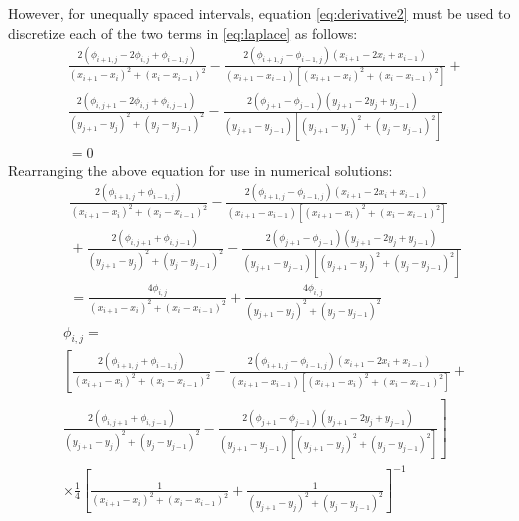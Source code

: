 \documentclass[12pt,a4paper,fleqn]{article}
\begin{document}
    However, for unequally spaced intervals, equation \eqref{eq:derivative2} must be used to discretize each of the two terms in \eqref{eq:laplace} as follows:
    \begin{align} \label{eq:numlaplace3}
    &\frac{2(\phi_{i+1,j} - 2\phi_{i,j} + \phi_{i-1,j})}{(x_{i+1} - x_i)^2 + (x_i - x_{i-1})^2} - \frac{2(\phi_{i+1,j} - \phi_{i-1,j})(x_{i+1} - 2x_i + x_{i-1})}{(x_{i+1} - x_{i-1})[(x_{i+1} - x_i)^2 + (x_i - x_{i-1})^2]} + {} \nonumber\\
    &\frac{2(\phi_{i,j+1} - 2\phi_{i,j} + \phi_{i,j-1})}{(y_{j+1} - y_j)^2 + (y_j - y_{j-1})^2} - \frac{2(\phi_{j+1} - \phi_{j-1})(y_{j+1} - 2y_j + y_{j-1})}{(y_{j+1} - y_{j-1})[(y_{j+1} - y_j)^2 + (y_j - y_{j-1})^2]} \nonumber\\
    &= 0
    \end{align}
    Rearranging the above equation for use in numerical solutions:
    \begin{align*}
    &\frac{2(\phi_{i+1,j} + \phi_{i-1,j})}{(x_{i+1} - x_i)^2 + (x_i - x_{i-1})^2} - \frac{2(\phi_{i+1,j} - \phi_{i-1,j})(x_{i+1} - 2x_i + x_{i-1})}{(x_{i+1} - x_{i-1})[(x_{i+1} - x_i)^2 + (x_i - x_{i-1})^2]} \\
    &{} + \frac{2(\phi_{i,j+1} + \phi_{i,j-1})}{(y_{j+1} - y_j)^2 + (y_j - y_{j-1})^2} - \frac{2(\phi_{j+1} - \phi_{j-1})(y_{j+1} - 2y_j + y_{j-1})}{(y_{j+1} - y_{j-1})[(y_{j+1} - y_j)^2 + (y_j - y_{j-1})^2]} \\
    &= \frac{4\phi_{i,j}}{(x_{i+1} - x_i)^2 + (x_i - x_{i-1})^2} + \frac{4\phi_{i,j}}{(y_{j+1} - y_j)^2 + (y_j - y_{j-1})^2}
    \end{align*}
    \begin{align*}
    &\phi_{i,j} = \\
    &\left[\frac{2(\phi_{i+1,j} + \phi_{i-1,j})}{(x_{i+1} - x_i)^2 + (x_i - x_{i-1})^2} - \frac{2(\phi_{i+1,j} - \phi_{i-1,j})(x_{i+1} - 2x_i + x_{i-1})}{(x_{i+1} - x_{i-1})[(x_{i+1} - x_i)^2 + (x_i - x_{i-1})^2]} + {} \right.\\
    &\left.\frac{2(\phi_{i,j+1} + \phi_{i,j-1})}{(y_{j+1} - y_j)^2 + (y_j - y_{j-1})^2} - \frac{2(\phi_{j+1} - \phi_{j-1})(y_{j+1} - 2y_j + y_{j-1})}{(y_{j+1} - y_{j-1})[(y_{j+1} - y_j)^2 + (y_j - y_{j-1})^2]}\right]\\
    &\times\frac{1}{4}\left[\frac{1}{(x_{i+1} - x_i)^2 + (x_i - x_{i-1})^2} + \frac{1}{(y_{j+1} - y_j)^2 + (y_j - y_{j-1})^2}\right]^{-1}
    \end{align*}
\end{document}
